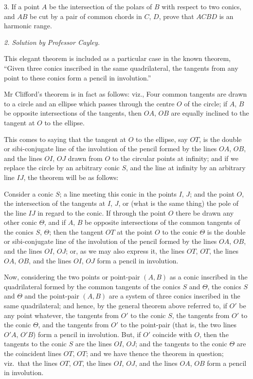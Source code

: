 \documentclass[11pt,a4paper]{article}
\begin{document}
3. If a point $A$ be the intersection of the polars of $B$ with respect to two
conics, and $AB$ be cut by a pair of common chords in $C$, $D$, prove that $ACBD$ is
an harmonic range.

\begin{center}
\textit{2. Solution by Professor Cayley.}
\end{center}

This elegant theorem is included as a particular case in the known theorem,
``Given three conics inscribed in the same quadrilateral, the tangents from any point
to these conics form a pencil in involution.''

Mr Clifford's theorem is in fact as follows: viz., Four common tangents are drawn
to a circle and an ellipse which passes through the centre $O$ of the circle; if $A$, $B$
be opposite intersections of the tangents, then $OA$, $OB$ are equally inclined to the
tangent at $O$ to the ellipse.

This comes to saying that the tangent at $O$ to the ellipse, say $OT$, is the double
or sibi-conjugate line of the involution of the pencil formed by the lines $OA$, $OB$,
and the lines $OI$, $OJ$ drawn from $O$ to the circular points at infinity; and if we
replace the circle by an arbitrary conic $S$, and the line at infinity by an arbitrary
line $IJ$, the theorem will be as follows:

Consider a conic $S$; a line meeting this conic in the points $I$, $J$; and the point
$O$, the intersection of the tangents at $I$, $J$, or (what is the same thing) the pole of
the line $IJ$ in regard to the conic. If through the point $O$ there be drawn any
other conic $\Theta$, and if $A$, $B$ be opposite intersections of the common tangents of the
conics $S$, $\Theta$; then the tangent $OT$ at the point $O$ to the conic $\Theta$ is the double or
sibi-conjugate line of the involution of the pencil formed by the lines $OA$, $OB$, and
the lines $OI$, $OJ$; or, as we may also express it, the lines $OT$, $OT$, the lines $OA$, $OB$,
and the lines $OI$, $OJ$ form a pencil in involution.

Now, considering the two points or point-pair $(A, B)$ as a conic inscribed in the
quadrilateral formed by the common tangents of the conics $S$ and $\Theta$, the conics
$S$ and $\Theta$ and the point-pair $(A, B)$ are a system of three conics inscribed in the
same quadrilateral; and hence, by the general theorem above referred to, if $O'$ be any
point whatever, the tangents from $O'$ to the conic $S$, the tangents from $O'$ to the
conic $\Theta$, and the tangents from $O'$ to the point-pair (that is, the two lines
$O'A$, $O'B$) form a pencil in involution. But, if $O'$ coincide with $O$, then the tangents
to the conic $S$ are the lines $OI$, $OJ$; and the tangents to the conic $\Theta$ are the
coincident lines $OT$, $OT$; and we have thence the theorem in question; viz.\ that the
lines $OT$, $OT$, the lines $OI$, $OJ$, and the lines $OA$, $OB$ form a pencil in involution.
\end{document}
